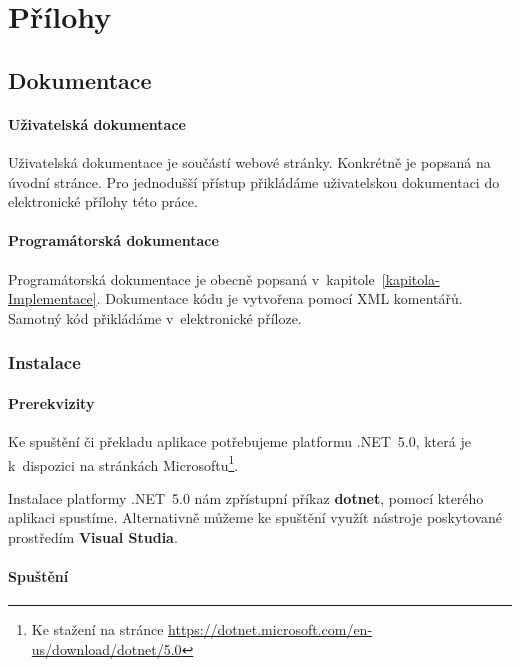 \chapter{Přílohy}


\section{Dokumentace}

\subsubsection{Uživatelská dokumentace}

Uživatelská dokumentace je součástí webové stránky. Konkrétně je popsaná na úvodní stránce. Pro jednodušší přístup přikládáme uživatelskou dokumentaci do elektronické přílohy této práce.

\subsubsection{Programátorská dokumentace}

Programátorská dokumentace je obecně popsaná v~kapitole~\ref{kapitola-Implementace}. Dokumentace kódu je vytvořena pomocí XML komentářů. Samotný kód přikládáme v~elektronické příloze.


\subsection{Instalace}

\subsubsection{Prerekvizity}

Ke spuštění či překladu aplikace potřebujeme platformu .NET~5.0, která je k~dispozici na stránkách Microsoftu\footnote{Ke stažení na stránce \url{https://dotnet.microsoft.com/en-us/download/dotnet/5.0}}.

Instalace platformy .NET~5.0 nám zpřístupní příkaz \textbf{dotnet}, pomocí kterého aplikaci spustíme. Alternativně můžeme ke spuštění využít nástroje poskytované prostředím \textbf{Visual Studia}.

\subsubsection{Spuštění}


